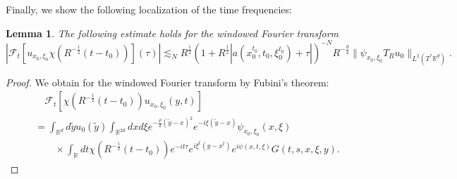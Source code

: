 \documentclass{amsart}
\newtheorem{lemma}[theorem]{Lemma}
\theoremstyle{definition}
\newcommand{\R}{\mathbb{R}}
\begin{document}
Finally, we show the following localization of the time frequencies:
\begin{lemma}
The following estimate holds for the windowed Fourier transform
\begin{equation}
\label{eq:TimeFrequencyLocalization}
|\mathcal{F}_t[ u_{x_0,\xi_0} \chi(R^{-\frac{1}{2}}(t-t_0))](\tau ) | \lesssim_N R^{\frac{1}{2}} (1 + R^{\frac{1}{2}} |a(x^{t_0}_0,t_0, \xi^{t_0}_0) + \tau |)^{-N} R^{-\frac{d}{4}} \| \psi_{x_0,\xi_0} T_R u_0 \|_{L^2(T^* \R^d)}.
\end{equation}
\end{lemma}
\begin{proof}
We obtain for the windowed Fourier transform by Fubini's theorem:
\begin{equation*}
\begin{split}
&\quad \mathcal{F}_t [ \chi(R^{-\frac{1}{2}}(t-t_0)) u_{x_0,\xi_0}(y,t) ] \\
&= \int_{\R^d} d \tilde{y} u_0(\tilde{y}) \int_{\R^{2d}} dx d\xi e^{-\frac{\rho}{2}(\tilde{y}-x)^2} e^{-i \xi (\tilde{y}-x)} \psi_{x_0,\xi_0}(x,\xi) \\
&\quad \quad \times \int_{\R} dt \chi(R^{-\frac{1}{2}}(t-t_0)) e^{-it \tau} e^{i \xi^t (y-x^t)} e^{i \psi(x,t,\xi)} G(t,s,x,\xi,y).
\end{split}
\end{equation*}


\end{proof}
\end{document}
